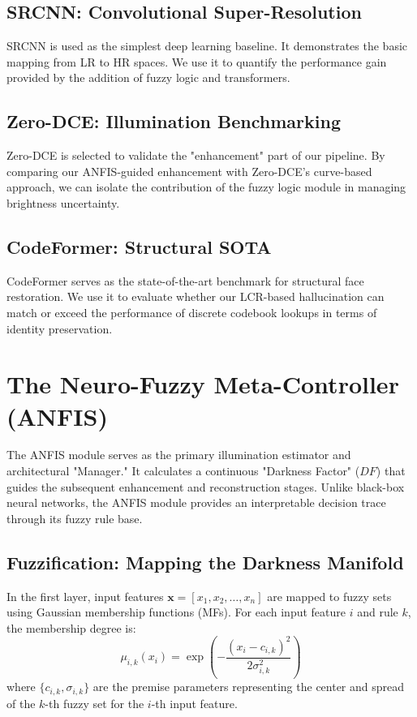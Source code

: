 \subsection{SRCNN: Convolutional Super-Resolution}
SRCNN is used as the simplest deep learning baseline. It demonstrates the basic mapping from LR to HR spaces. We use it to quantify the performance gain provided by the addition of fuzzy logic and transformers.

\subsection{Zero-DCE: Illumination Benchmarking}
Zero-DCE is selected to validate the "enhancement" part of our pipeline. By comparing our ANFIS-guided enhancement with Zero-DCE's curve-based approach, we can isolate the contribution of the fuzzy logic module in managing brightness uncertainty.

\subsection{CodeFormer: Structural SOTA}
CodeFormer serves as the state-of-the-art benchmark for structural face restoration. We use it to evaluate whether our LCR-based hallucination can match or exceed the performance of discrete codebook lookups in terms of identity preservation.

\section{The Neuro-Fuzzy Meta-Controller (ANFIS)}
The ANFIS module serves as the primary illumination estimator and architectural "Manager." It calculates a continuous "Darkness Factor" ($DF$) that guides the subsequent enhancement and reconstruction stages. Unlike black-box neural networks, the ANFIS module provides an interpretable decision trace through its fuzzy rule base.

\subsection{Fuzzification: Mapping the Darkness Manifold}
In the first layer, input features $\mathbf{x} = [x_1, x_2, \dots, x_n]$ are mapped to fuzzy sets using Gaussian membership functions (MFs). For each input feature $i$ and rule $k$, the membership degree is:
\begin{equation}
    \mu_{i,k}(x_i) = \exp \left( -\frac{(x_i - c_{i,k})^2}{2\sigma_{i,k}^2} \right)
\end{equation}
where $\{c_{i,k}, \sigma_{i,k}\}$ are the premise parameters representing the center and spread of the $k$-th fuzzy set for the $i$-th input feature. 

